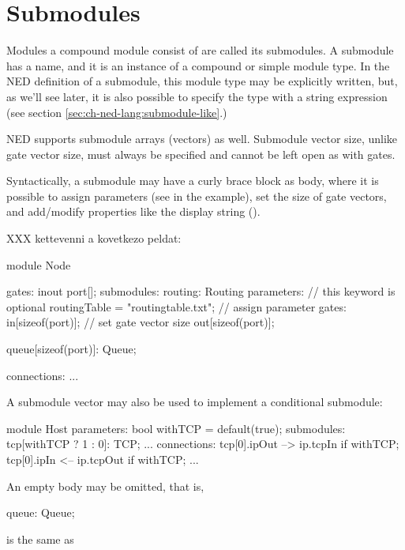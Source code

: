 \section{Submodules}
\label{sec:ch-ned-lang:submodules}

Modules a compound module consist of are called its submodules.
A submodule has a name, and it is an instance of a compound or simple
module type. In the NED definition of a submodule, this module type
may be explicitly written, but, as we'll see later, it is also possible
to specify the type with a string expression (see section
\ref{sec:ch-ned-lang:submodule-like}.)

NED supports submodule arrays (vectors) as well. Submodule vector size,
unlike gate vector size, must always be specified and cannot be left
open as with gates.

Syntactically, a submodule may have a curly brace block as body, where
it is possible to assign parameters (see  in the example),
set the size of gate vectors, and add/modify properties like the
display string ().

XXX kettevenni a kovetkezo peldat:
\begin{ned}
module Node
{
    gates:
        inout port[];
    submodules:
        routing: Routing {
            parameters:   // this keyword is optional
                routingTable = "routingtable.txt"; // assign parameter
            gates:
                in[sizeof(port)];  // set gate vector size
                out[sizeof(port)];
        }

        queue[sizeof(port)]: Queue;

    connections:
        ...
}
\end{ned}

A submodule vector may also be used to implement a conditional submodule:

\begin{ned}
module Host
{
    parameters:
        bool withTCP = default(true);
    submodules:
        tcp[withTCP ? 1 : 0]: TCP;
        ...
    connections:
        tcp[0].ipOut --> ip.tcpIn if withTCP;
        tcp[0].ipIn <-- ip.tcpOut if withTCP;
        ...
}
\end{ned}

An empty body may be omitted, that is,

\begin{ned}
      queue: Queue;
\end{ned}

is the same as

